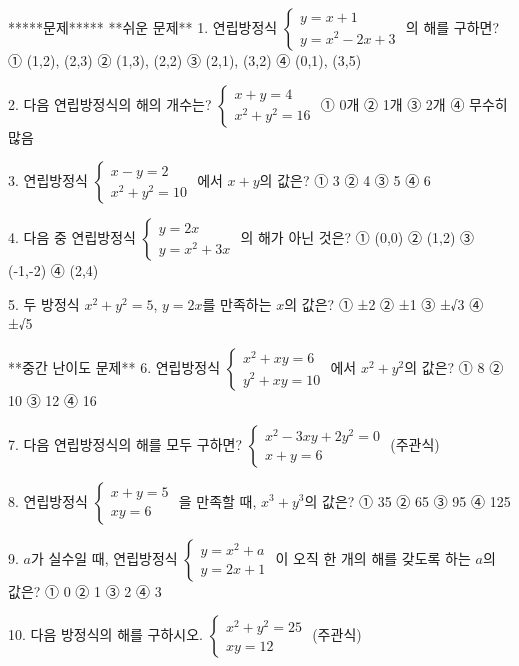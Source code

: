 \documentclass[fleqn]{article}
\begin{document}
      
    *****문제*****  
**쉬운 문제**  
1. 연립방정식  
\( \begin{cases} y = x + 1 \\ y = x^2 - 2x + 3 \end{cases} \)  
의 해를 구하면?  
① (1,2), (2,3) ② (1,3), (2,2) ③ (2,1), (3,2) ④ (0,1), (3,5)  

2. 다음 연립방정식의 해의 개수는?  
\( \begin{cases} x + y = 4 \\ x^2 + y^2 = 16 \end{cases} \)  
① 0개 ② 1개 ③ 2개 ④ 무수히 많음  

3. 연립방정식  
\( \begin{cases} x - y = 2 \\ x^2 + y^2 = 10 \end{cases} \)  
에서 \( x+y \)의 값은?  
① 3 ② 4 ③ 5 ④ 6  

4. 다음 중 연립방정식  
\( \begin{cases} y = 2x \\ y = x^2 + 3x \end{cases} \)  
의 해가 아닌 것은?  
① (0,0) ② (1,2) ③ (-1,-2) ④ (2,4)  

5. 두 방정식 \( x^2 + y^2 = 5 \), \( y = 2x \)를 만족하는 \( x \)의 값은?  
① ±2 ② ±1 ③ ±√3 ④ ±√5  

**중간 난이도 문제**  
6. 연립방정식  
\( \begin{cases} x^2 + xy = 6 \\ y^2 + xy = 10 \end{cases} \)  
에서 \( x^2 + y^2 \)의 값은?  
① 8 ② 10 ③ 12 ④ 16  

7. 다음 연립방정식의 해를 모두 구하면?  
\( \begin{cases} x^2 - 3xy + 2y^2 = 0 \\ x + y = 6 \end{cases} \)  
(주관식)  

8. 연립방정식  
\( \begin{cases} x + y = 5 \\ xy = 6 \end{cases} \)  
을 만족할 때, \( x^3 + y^3 \)의 값은?  
① 35 ② 65 ③ 95 ④ 125  

9. \( a \)가 실수일 때, 연립방정식  
\( \begin{cases} y = x^2 + a \\ y = 2x + 1 \end{cases} \)  
이 오직 한 개의 해를 갖도록 하는 \( a \)의 값은?  
① 0 ② 1 ③ 2 ④ 3  

10. 다음 방정식의 해를 구하시오.  
\( \begin{cases} x^2 + y^2 = 25 \\ xy = 12 \end{cases} \)  
(주관식)  
\end{document}
